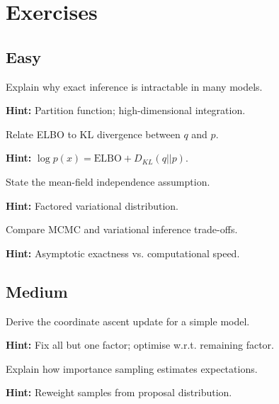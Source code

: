 
\section*{Exercises}

\subsection*{Easy}

\begin{problem}
Explain why exact inference is intractable in many models.

\textbf{Hint:} Partition function; high-dimensional integration.
\end{problem}

\begin{problem}
Relate ELBO to KL divergence between $q$ and $p$.

\textbf{Hint:} $\log p(x) = \text{ELBO} + D_{KL}(q||p)$.
\end{problem}

\begin{problem}
State the mean-field independence assumption.

\textbf{Hint:} Factored variational distribution.
\end{problem}

\begin{problem}[MCMC vs. VI]
Compare MCMC and variational inference trade-offs.

\textbf{Hint:} Asymptotic exactness vs. computational speed.
\end{problem}

\subsection*{Medium}

\begin{problem}
Derive the coordinate ascent update for a simple model.

\textbf{Hint:} Fix all but one factor; optimise w.r.t. remaining factor.
\end{problem}

\begin{problem}
Explain how importance sampling estimates expectations.

\textbf{Hint:} Reweight samples from proposal distribution.
\end{problem}

